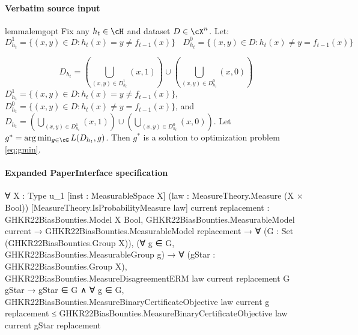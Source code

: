 \documentclass[10pt]{article}
\begin{document}
\paragraph{Verbatim source input}
\begin{ReviewVerbatim}
\begin{restatable}{lemma}{lemgopt}
\label{lem:gopt}
 Fix any $h_t \in \cH$ and dataset $D \in \cX^n$. Let:
 \ifdraft
 $$D_{h_t}^1 = \{(x,y) \in D : h_t(x) = y \neq f_{t-1}(x)\} \ \ \ \ D_{h_t}^0 = \{(x,y) \in D : h_t(x) \neq y = f_{t-1}(x)\}$$

$$D_{h_t} = \left(\bigcup_{(x,y) \in D_{h_t}^1} (x, 1)\right) \cup \left(\bigcup_{(x,y) \in D_{h_t}^0} (x, 0)\right)$$
\else $D_{h_t}^1 = \{(x,y) \in D : h_t(x) = y \neq f_{t-1}(x)\}$, $D_{h_t}^0 = \{(x,y) \in D : h_t(x) \neq y = f_{t-1}(x)\}$, and $D_{h_t} = \left(\bigcup_{(x,y) \in D_{h_t}^1} (x, 1)\right) \cup \left(\bigcup_{(x,y) \in D_{h_t}^0} (x, 0)\right)$. \fi
Let $g^* = \arg\min_{g \in \cG} L(D_{h_t},g)$. Then $g^*$ is a solution to optimization problem \eqref{eq:gmin}.
\end{restatable}
\end{ReviewVerbatim}



\paragraph{Expanded PaperInterface specification}
\begin{ReviewVerbatim}
∀ {X : Type u_1} [inst : MeasurableSpace X] (law : MeasureTheory.Measure (X × Bool))
  [MeasureTheory.IsProbabilityMeasure law] {current replacement : GHKR22BiasBounties.Model X Bool},
  GHKR22BiasBounties.MeasurableModel current →
    GHKR22BiasBounties.MeasurableModel replacement →
      ∀ (G : Set (GHKR22BiasBounties.Group X)),
        (∀ g ∈ G, GHKR22BiasBounties.MeasurableGroup g) →
          ∀ (gStar : GHKR22BiasBounties.Group X),
            GHKR22BiasBounties.MeasureDisagreementERM law current replacement G gStar →
              gStar ∈ G ∧
                ∀ g ∈ G,
                  GHKR22BiasBounties.MeasureBinaryCertificateObjective law current g replacement ≤
                    GHKR22BiasBounties.MeasureBinaryCertificateObjective law current gStar replacement
\end{ReviewVerbatim}
\end{document}
